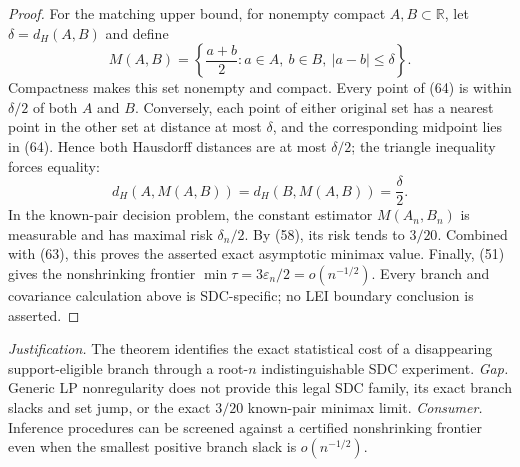 \documentclass{article}
\begin{document}
\begin{proof}
For the matching upper bound, for nonempty compact \(A,B\subset\mathbb R\), let \(\delta=d_H(A,B)\) and define
\[
 M(A,B)=\left\{\frac{a+b}{2}:a\in A,\ b\in B,\ |a-b|\le\delta\right\}.     \tag{64}
\]
Compactness makes this set nonempty and compact.  Every point of (64) is within \(\delta/2\) of both \(A\) and \(B\).  Conversely, each point of either original set has a nearest point in the other set at distance at most \(\delta\), and the corresponding midpoint lies in (64).  Hence both Hausdorff distances are at most \(\delta/2\); the triangle inequality forces equality:
\[
 d_H(A,M(A,B))=d_H(B,M(A,B))=\frac\delta2.                                   \tag{65}
\]
In the known-pair decision problem, the constant estimator \(M(A_n,B_n)\) is measurable and has maximal risk \(\delta_n/2\).  By (58), its risk tends to \(3/20\).  Combined with (63), this proves the asserted exact asymptotic minimax value.  Finally, (51) gives the nonshrinking frontier \(\min\tau=3\varepsilon_n/2=o(n^{-1/2})\).  Every branch and covariance calculation above is SDC-specific; no LEI boundary conclusion is asserted.
\end{proof}
\par\smallskip\noindent \textit{Justification.} The theorem identifies the exact statistical cost of a disappearing support-eligible branch through a root-\(n\) indistinguishable SDC experiment. \textit{Gap.} Generic LP nonregularity does not provide this legal SDC family, its exact branch slacks and set jump, or the exact \(3/20\) known-pair minimax limit. \textit{Consumer.} Inference procedures can be screened against a certified nonshrinking frontier even when the smallest positive branch slack is \(o(n^{-1/2})\).
\end{document}
